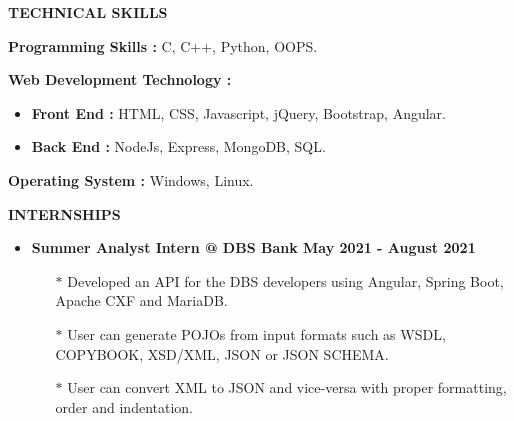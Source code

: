 \documentclass{article}
\begin{document}
{{{{\vspace{7mm}
\medskip
\large {{\bf  \color[rgb]{0,0,1} TECHNICAL SKILLS}} \hrulefill \par
\vspace{1.5mm}
\smallskip
\normalsize { {\bf Programming Skills :}  C, C++, Python, OOPS. } \par
\vspace{3mm}
\normalsize { {\bf Web Development Technology :}
\vspace{-2mm}
 \begin{itemize}
	\item {\bf Front End :} HTML, CSS, Javascript, jQuery, Bootstrap, Angular. 
	\vspace{-2mm}    
    \item {\bf Back End :} NodeJs, Express, MongoDB, SQL.
 \end{itemize} \par
\vspace{1mm}
\normalsize { {\bf Operating System :} Windows, Linux. } \par





\vspace{7mm}

{\medskip
\large { {\bf  \color[rgb]{0,0,1} INTERNSHIPS}} \hrulefill \par
\normalsize

\begin{itemize}
\item   {\bf Summer Analyst Intern @ DBS Bank {\hfill May 2021 - August 2021}}
\vspace{-2mm}
\begin{itemize}
  \vspace{0.5mm}
  \item[$\ast$] Developed an API for the DBS developers using Angular, Spring Boot, Apache CXF and MariaDB. 
  \vspace{-0.5mm}
  \item[$\ast$] User can generate POJOs from input formats such as WSDL, COPYBOOK, XSD/XML, JSON or JSON SCHEMA.
  \item[$\ast$] User can convert XML to JSON and vice-versa with proper formatting, order and indentation.
\end{itemize}


\end{itemize}}}}}}}
\end{document}
